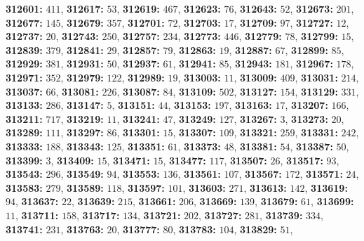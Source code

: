 \textsf{\bfseries 312601:} $411$, \textsf{\bfseries 312617:} $53$, \textsf{\bfseries 312619:} $467$, \textsf{\bfseries 312623:} $76$, \textsf{\bfseries 312643:} $52$, \textsf{\bfseries 312673:} $201$, \textsf{\bfseries 312677:} $145$, \textsf{\bfseries 312679:} $357$, \textsf{\bfseries 312701:} $72$, \textsf{\bfseries 312703:} $17$, \textsf{\bfseries 312709:} $97$, \textsf{\bfseries 312727:} $12$, \textsf{\bfseries 312737:} $20$, \textsf{\bfseries 312743:} $250$, \textsf{\bfseries 312757:} $234$, \textsf{\bfseries 312773:} $446$, \textsf{\bfseries 312779:} $78$, \textsf{\bfseries 312799:} $15$, \textsf{\bfseries 312839:} $379$, \textsf{\bfseries 312841:} $29$, \textsf{\bfseries 312857:} $79$, \textsf{\bfseries 312863:} $19$, \textsf{\bfseries 312887:} $67$, \textsf{\bfseries 312899:} $85$, \textsf{\bfseries 312929:} $381$, \textsf{\bfseries 312931:} $50$, \textsf{\bfseries 312937:} $61$, \textsf{\bfseries 312941:} $85$, \textsf{\bfseries 312943:} $181$, \textsf{\bfseries 312967:} $178$, \textsf{\bfseries 312971:} $352$, \textsf{\bfseries 312979:} $122$, \textsf{\bfseries 312989:} $19$, \textsf{\bfseries 313003:} $11$, \textsf{\bfseries 313009:} $409$, \textsf{\bfseries 313031:} $214$, \textsf{\bfseries 313037:} $66$, \textsf{\bfseries 313081:} $226$, \textsf{\bfseries 313087:} $84$, \textsf{\bfseries 313109:} $502$, \textsf{\bfseries 313127:} $154$, \textsf{\bfseries 313129:} $331$, \textsf{\bfseries 313133:} $286$, \textsf{\bfseries 313147:} $5$, \textsf{\bfseries 313151:} $44$, \textsf{\bfseries 313153:} $197$, \textsf{\bfseries 313163:} $17$, \textsf{\bfseries 313207:} $166$, \textsf{\bfseries 313211:} $717$, \textsf{\bfseries 313219:} $11$, \textsf{\bfseries 313241:} $47$, \textsf{\bfseries 313249:} $127$, \textsf{\bfseries 313267:} $3$, \textsf{\bfseries 313273:} $20$, \textsf{\bfseries 313289:} $111$, \textsf{\bfseries 313297:} $86$, \textsf{\bfseries 313301:} $15$, \textsf{\bfseries 313307:} $109$, \textsf{\bfseries 313321:} $259$, \textsf{\bfseries 313331:} $242$, \textsf{\bfseries 313333:} $188$, \textsf{\bfseries 313343:} $125$, \textsf{\bfseries 313351:} $61$, \textsf{\bfseries 313373:} $48$, \textsf{\bfseries 313381:} $54$, \textsf{\bfseries 313387:} $50$, \textsf{\bfseries 313399:} $3$, \textsf{\bfseries 313409:} $15$, \textsf{\bfseries 313471:} $15$, \textsf{\bfseries 313477:} $117$, \textsf{\bfseries 313507:} $26$, \textsf{\bfseries 313517:} $93$, \textsf{\bfseries 313543:} $296$, \textsf{\bfseries 313549:} $94$, \textsf{\bfseries 313553:} $136$, \textsf{\bfseries 313561:} $107$, \textsf{\bfseries 313567:} $172$, \textsf{\bfseries 313571:} $24$, \textsf{\bfseries 313583:} $279$, \textsf{\bfseries 313589:} $118$, \textsf{\bfseries 313597:} $101$, \textsf{\bfseries 313603:} $271$, \textsf{\bfseries 313613:} $142$, \textsf{\bfseries 313619:} $94$, \textsf{\bfseries 313637:} $22$, \textsf{\bfseries 313639:} $215$, \textsf{\bfseries 313661:} $206$, \textsf{\bfseries 313669:} $139$, \textsf{\bfseries 313679:} $61$, \textsf{\bfseries 313699:} $11$, \textsf{\bfseries 313711:} $158$, \textsf{\bfseries 313717:} $134$, \textsf{\bfseries 313721:} $202$, \textsf{\bfseries 313727:} $281$, \textsf{\bfseries 313739:} $334$, \textsf{\bfseries 313741:} $231$, \textsf{\bfseries 313763:} $20$, \textsf{\bfseries 313777:} $80$, \textsf{\bfseries 313783:} $104$, \textsf{\bfseries 313829:} $51$, 

